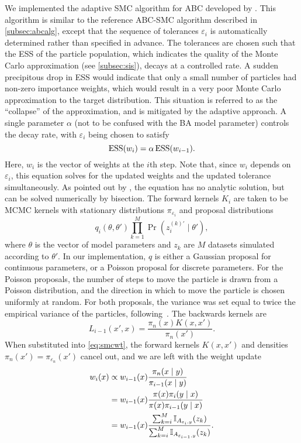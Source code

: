 We implemented the adaptive \gls{SMC} algorithm for \gls{ABC} developed by
\textcite{del2012adaptive}. This algorithm is similar to the reference
\gls{ABC}-\gls{SMC} algorithm described in \cref{subsec:abcalg}, except that
the sequence of tolerances $\varepsilon_i$ is automatically determined rather
than specified in advance. The tolerances are chosen such that the \gls{ESS} of
the particle population, which indicates the quality of the Monte Carlo
approximation (see \cref{subsec:sis}), decays at a controlled rate. A
sudden precipitous drop in \gls{ESS} would indicate that only a small number of
particles had non-zero importance weights, which would result in a very poor
Monte Carlo approximation to the target distribution. This situation is
referred to as the ``collapse'' of the approximation, and is mitigated by the
adaptive approach. A single parameter $\alpha$ (not to be confused with the
\gls{BA} model parameter) controls the decay rate, with $\varepsilon_i$ being
chosen to satisfy
\[
  \operatorname{ESS}(w_i) = \alpha \operatorname{ESS}(w_{i-1}).
\]
Here, $w_i$ is the vector of weights at the $i$th step. Note that, since $w_i$
depends on $\varepsilon_i$, this equation solves for the updated weights and
the updated tolerance simultaneously. As pointed out by
\textcite{del2012adaptive}, the equation has no analytic solution, but can be
solved numerically by bisection. The forward kernels $K_i$ are taken to be
\gls{MCMC} kernels with stationary distributions $\pi_{\varepsilon_i}$ and
proposal distributions
\[
  q_i(\theta, \theta') \prod_{k=1}^M \Pr(z_i^{(k)'} \mid \theta'),
\]
where $\theta$ is the vector of model parameters and $z_k$ are $M$ datasets
simulated according to $\theta'$. In our implementation, $q$ is either a
Gaussian proposal for continuous parameters, or a Poisson proposal for discrete
parameters. For the Poisson proposals, the number of steps to move the particle
is drawn from a Poisson distribution, and the direction in which to move the
particle is chosen uniformly at random. For both proposals, the variance was
set equal to twice the empirical variance of the particles,
following~\autocite{beaumont2009adaptive, del2012adaptive}. The backwards
kernels are
\[
  L_{i-1}(x', x) = \frac{\pi_n(x)K(x, x')}{\pi_n(x')}.
\]
When substituted into \cref{eq:smcwt}, the forward kernels $K(x, x')$ and
densities $\pi_n(x') = \pi_{\varepsilon_n}(x')$ cancel out, and we are left
with the weight update 
\begin{align*}
  w_i(x) 
    &\propto w_{i-1}(x) \frac{\pi_n(x \mid y)}{\pi_{i-1}(x \mid y)} \\
    &= w_{i-1}(x) \frac{\pi(x) \pi_i(y \mid x)}{\pi(x) \pi_{i-1}(y \mid x)} \\
    &= w_{i-1}(x) \frac{\sum_{k=i}^M \mathbb{I}_{A_{\varepsilon_i, y}}(z_k)}
            {\sum_{k=i}^M \mathbb{I}_{A_{\varepsilon_{i-1}, y}}(z_k)}.
\end{align*}
